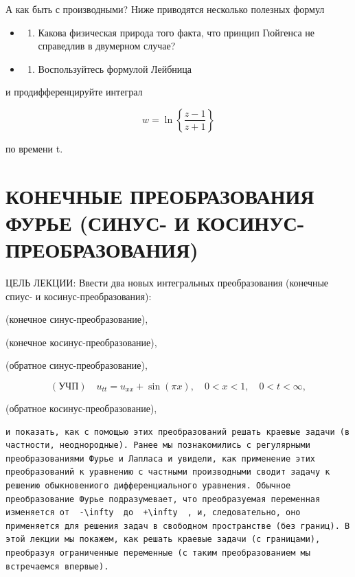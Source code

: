\documentclass[
  ukrainian,
]{article}
\providecommand{\tightlist}{%
  \setlength{\itemsep}{0pt}\setlength{\parskip}{0pt}}
\begin{document}
А как быть с производными? Ниже приводятся несколько полезных формул

\begin{itemize}
\tightlist
\item
  \begin{enumerate}
  \def\labelenumi{\arabic{enumi}.}
  \setcounter{enumi}{5}
  \tightlist
  \item
    Какова физическая природа того факта, что принцип Гюйгенса не
    справедлив в двумерном случае?
  \end{enumerate}
\item
  \begin{enumerate}
  \def\labelenumi{\arabic{enumi}.}
  \setcounter{enumi}{6}
  \tightlist
  \item
    Воспользуйтесь формулой Лейбница
  \end{enumerate}
\end{itemize}

и продифференцируйте интеграл

\[
w = \ln\left\{\frac{z-1}{z+1}\right\}
\]

по времени t.

\section{КОНЕЧНЫЕ ПРЕОБРАЗОВАНИЯ ФУРЬЕ (СИНУС- И
КОСИНУС-ПРЕОБРАЗОВАНИЯ)}\label{ux43aux43eux43dux435ux447ux43dux44bux435-ux43fux440ux435ux43eux431ux440ux430ux437ux43eux432ux430ux43dux438ux44f-ux444ux443ux440ux44cux435-ux441ux438ux43dux443ux441--ux438-ux43aux43eux441ux438ux43dux443ux441-ux43fux440ux435ux43eux431ux440ux430ux437ux43eux432ux430ux43dux438ux44f}

ЦЕЛЬ ЛЕКЦИИ: Ввести два новых интегральных преобразования (конечные
спиус- и косинус-преобразования):

(конечное синус-преобразование),

(конечное косинус-преобразование),

(обратное синус-преобразование),

\[
(\text{УЧП}) \quad u_{tt} = u_{xx} + \sin(\pi x), \quad 0 < x < 1, \quad 0 < t < \infty,
\]

(обратное косинус-преобразование),

\begin{verbatim}
и показать, как с помощью этих преобразований решать краевые задачи (в частности, неоднородные). Ранее мы познакомились с регулярными преобразованиями Фурье и Лапласа и увидели, как применение этих преобразований к уравнению с частными производными сводит задачу к решению обыкновениого дифференциального уравнения. Обычное преобразование Фурье подразумевает, что преобразуемая переменная изменяется от  -\infty  до  +\infty  , и, следовательно, оно применяется для решения задач в свободном пространстве (без границ). В этой лекции мы покажем, как решать краевые задачи (с границами), преобразуя ограниченные переменные (с таким преобразованием мы встречаемся впервые).
\end{verbatim}
\end{document}

